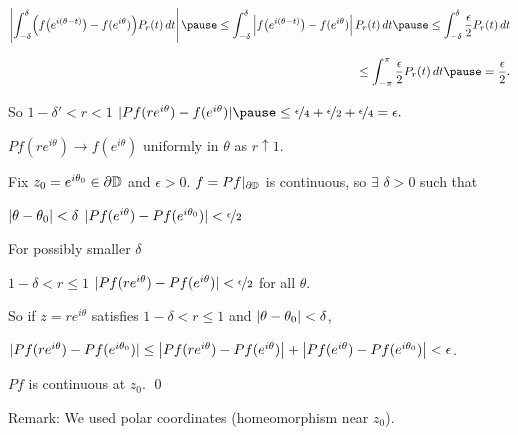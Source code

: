 \documentclass[10pt,aspectratio=169]{beamer}
\begin{document}
\begin{frame}
$\displaystyle
\abs{
\int_{-\delta}^{\delta} \Bigl( f\bigl(e^{i(\theta-t)}\bigr)-f(e^{i\theta}) \Bigr) P_r(t) \, dt
}
\pause
\leq
\int_{-\delta}^{\delta} \abs{f\bigl(e^{i(\theta-t)}\bigr)-f(e^{i\theta})}
P_r(t) \, dt
\pause
\leq
\int_{-\delta}^{\delta} \frac{\epsilon}{2} P_r(t) \, dt$

\smallskip
$\displaystyle
\hspace*{4.0in}
\leq
\int_{-\pi}^{\pi} \frac{\epsilon}{2} P_r(t) \, dt
\pause
=\frac{\epsilon}{2} .
$

\vspace*{-6pt}

\pause
So $1-\delta' < r < 1$ \wthus
$
\sabs{
Pf(r e^{i\theta} ) - f(e^{i\theta})
} \pause
\leq \nicefrac{\epsilon}{4} + \nicefrac{\epsilon}{2} + \nicefrac{\epsilon}{4} =
\epsilon.$

\pause
\thus \quad $Pf(re^{i\theta}) \to f(e^{i\theta})$ uniformly in $\theta$
as $r \uparrow 1$.

\pause
\medskip

Fix $z_0 = e^{i\theta_0} \in \partial {\mathbb{D}}$ and $\epsilon > 0$.
\quad
\pause
$f = Pf|_{\partial {\mathbb{D}}}$ is
continuous, so $\exists$ $\delta > 0$ such that

\medskip

$\lvert {\theta-\theta_0} \rvert < \delta$ \wthus
$
\lvert {Pf(e^{i\theta})-Pf(e^{i\theta_0})} \rvert < \nicefrac{\epsilon}{2}$

\medskip
\pause

For possibly smaller
$\delta$

\medskip

$1 - \delta < r \leq 1$ \wthus 
$\lvert {Pf(re^{i \theta})-Pf(e^{i\theta})} \rvert < \nicefrac{\epsilon}{2}$
\quad for all $\theta$.

\medskip
\pause
So if $z=re^{i\theta}$ satisfies $1 - \delta < r \leq 1$ and
$\lvert {\theta-\theta_0} \rvert < \delta$,

\medskip
\pause

$
\lvert {Pf(re^{i\theta})-Pf(e^{i\theta_0})} \rvert
\leq
\bigl\lvert {Pf(re^{i\theta})-Pf(e^{i\theta})} \bigr\rvert
+
\bigl\lvert {Pf(e^{i\theta})-Pf(e^{i\theta_0})} \bigr\rvert
 < \epsilon$.

\vspace{-1.15in}
\hspace*{4in}


\medskip
\pause

\thus \quad
$Pf$ is continuous at $z_0$.
\qed

\medskip
\pause

Remark: We used polar coordinates (homeomorphism near $z_0$).
\end{frame}
\end{document}
